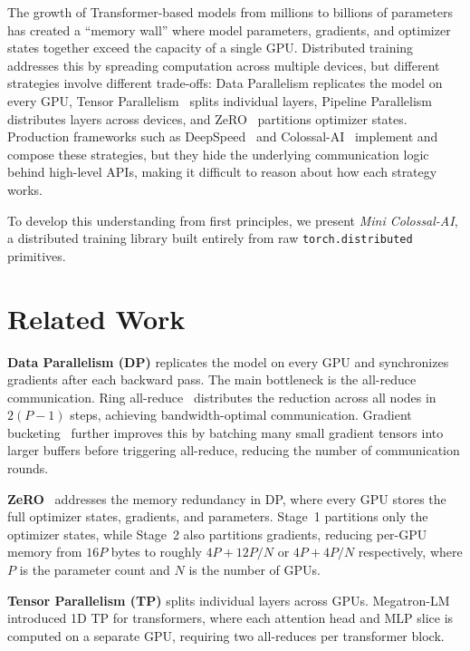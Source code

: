 \documentclass[conference]{IEEEtran}
\begin{document}
The growth of Transformer-based models from millions to billions of parameters~\cite{DBLP:journals/corr/abs-1810-04805, DBLP:journals/corr/abs-2005-14165} has created a ``memory wall'' where model parameters, gradients, and optimizer states together exceed the capacity of a single GPU. Distributed training addresses this by spreading computation across multiple devices, but different strategies involve different trade-offs: Data Parallelism replicates the model on every GPU, Tensor Parallelism~\cite{DBLP:journals/corr/abs-1909-08053} splits individual layers, Pipeline Parallelism~\cite{DBLP:journals/corr/abs-1811-06965, 10.1145/3341301.3359646} distributes layers across devices, and ZeRO~\cite{rajbhandari2019zero} partitions optimizer states. Production frameworks such as DeepSpeed~\cite{rasley2020deepspeed} and Colossal-AI~\cite{10.1145/3605573.3605613} implement and compose these strategies, but they hide the underlying communication logic behind high-level APIs, making it difficult to reason about how each strategy works.

To develop this understanding from first principles, we present \textit{Mini Colossal-AI}, a distributed training library built entirely from raw \texttt{torch.distributed} primitives. 

\section{Related Work}

\textbf{Data Parallelism (DP)} replicates the model on every GPU and synchronizes gradients after each backward pass. The main bottleneck is the all-reduce communication. Ring all-reduce~\cite{patarasuk2009bandwidth} distributes the reduction across all nodes in $2(P{-}1)$ steps, achieving bandwidth-optimal communication. Gradient bucketing~\cite{li2020pytorch} further improves this by batching many small gradient tensors into larger buffers before triggering all-reduce, reducing the number of communication rounds.

\textbf{ZeRO}~\cite{rajbhandari2019zero} addresses the memory redundancy in DP, where every GPU stores the full optimizer states, gradients, and parameters. Stage~1 partitions only the optimizer states, while Stage~2 also partitions gradients, reducing per-GPU memory from $16P$ bytes to roughly $4P + 12P/N$ or $4P + 4P/N$ respectively, where $P$ is the parameter count and $N$ is the number of GPUs.

\textbf{Tensor Parallelism (TP)} splits individual layers across GPUs. Megatron-LM~\cite{DBLP:journals/corr/abs-1909-08053} introduced 1D TP for transformers, where each attention head and MLP slice is computed on a separate GPU, requiring two all-reduces per transformer block.
\end{document}
